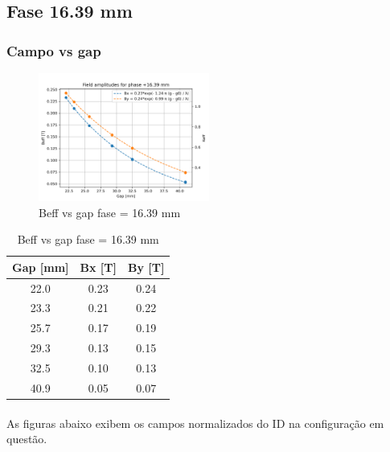 \documentclass[a4paper,12pt]{article}
\begin{document}
\subsection{Fase 16.39 mm}

\subsubsection{Campo vs gap}
\begin{figure}[H]
\hspace{4cm}
\includegraphics[width=0.5\textwidth]{figs/phase16 B vs gap.png}
\caption{Beff vs gap fase = 16.39 mm}
\label{fig:fieldgap16}
\end{figure}

\begin{table}[H]
\caption{Beff vs gap fase = 16.39 mm}
\centering
\begin{tabular}{|c|c|c|}
\hline
   Gap [mm] &   Bx [T] &   By [T] \\
\hline
       22.0 &     0.23 &     0.24 \\
       23.3 &     0.21 &     0.22 \\
       25.7 &     0.17 &     0.19 \\
       29.3 &     0.13 &     0.15 \\
       32.5 &    0.10 &    0.13 \\
       40.9 &     0.05 &     0.07 \\
\hline
\end{tabular}
\end{table}

\paragraph{} As figuras abaixo exibem os campos normalizados do ID na configuração em questão.
\end{document}
